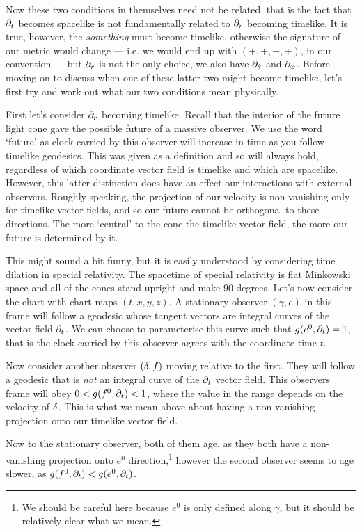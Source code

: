 Now these two conditions in themselves need not be related, that is the fact that $\partial_t$ becomes spacelike is not fundamentally related to $\partial_r$ becoming timelike. It is true, however, the \textit{something} must become timelike, otherwise the signature of our metric would change --- i.e. we would end up with $(+,+,+,+)$, in our convention --- but $\partial_r$ is not the only choice, we also have $\partial_{\theta}$ and $\partial_{\varphi}$. Before moving on to discuss when one of these latter two might become timelike, let's first try and work out what our two conditions mean physically. 

First let's consider $\partial_r$ becoming timelike. Recall that the interior of the future light cone gave the possible future of a massive observer. We use the word `future' as clock carried by this observer will increase in time as you follow timelike geodesics. This was given as a definition and so will always hold, regardless of which coordinate vector field is timelike and which are spacelike. However, this latter distinction does have an effect our interactions with external observers. Roughly speaking, the projection of our velocity is non-vanishing only for timelike vector fields, and so our future cannot be orthogonal to these directions. The more `central' to the cone the timelike vector field, the more our future is determined by it.

This might sound a bit funny, but it is easily understood by considering time dilation in special relativity. The spacetime of special relativity is flat Minkowski space and all of the cones stand upright and make 90 degrees. Let's now consider the chart with chart maps $(t,x,y,z)$. A stationary observer $(\gamma,e)$ in this frame will follow a geodesic whose tangent vectors are integral curves of the vector field $\partial_t$. We can choose to parameterise this curve such that $g(e^0,\partial_t)=1$, that is the clock carried by this observer agrees with the coordinate time $t$. 

Now consider another observer $(\delta,f)$ moving relative to the first. They will follow a geodesic that is \textit{not} an integral curve of the $\partial_t$ vector field. This observers frame will obey $0<g(f^0,\partial_t)<1$, where the value in the range depends on the velocity of $\delta$. This is what we mean above about having a non-vanishing projection onto our timelike vector field. 

Now to the stationary observer, both of them age, as they both have a non-vanishing projection onto $e^0$ direction,\footnote{We should be careful here because $e^0$ is only defined along $\gamma$, but it should be relatively clear what we mean.} however the second observer seems to age slower, as $g(f^0,\partial_t)<g(e^0,\partial_t)$. 

